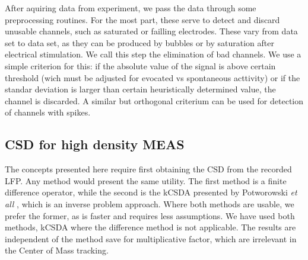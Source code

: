 \documentclass{article}
\begin{document}
After aquiring data from experiment, we pass the data through some preprocessing
routines. For the most part, these serve to detect and discard unusable channels,
such as saturated or failling electrodes. These vary from data set to data set,
as they can be produced by bubbles or by saturation after electrical stimulation.
We call this step the elimination of bad channels. We use a simple criterion for this:
if the absolute value of the signal is above certain threshold (wich must be
adjusted for evocated vs spontaneous acttivity) or if the standar deviation is
larger than certain heuristically determined value, the channel is discarded.
A similar but orthogonal criterium can be used for detection of channels with
spikes. 




\subsection{CSD for high density MEAS}

The concepts presented here require first obtaining the CSD from the recorded LFP. Any method would present the same utility. The first method is a  finite difference operator, while the second is the kCSDA presented by Potworowski \emph{et all} \cite{Potworowski2011}, which is an inverse problem approach.  Where both methods are usable, we prefer the former, as is faster and requires less assumptions. We have used both methods, kCSDA where
the difference method is not applicable. The results are
independent of the method save for multiplicative factor, which
are irrelevant in the Center of Mass tracking. 
\end{document}
